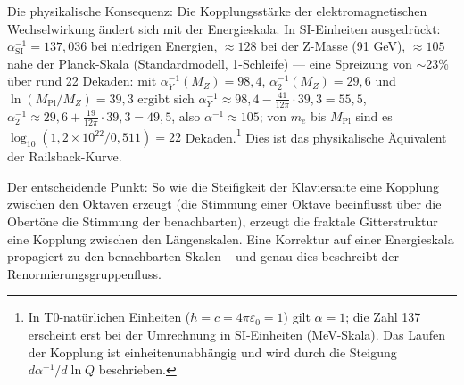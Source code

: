 Die physikalische Konsequenz: Die Kopplungsstärke der elektromagnetischen Wechselwirkung ändert sich mit der Energieskala. In SI-Einheiten ausgedrückt: $\alpha_\text{SI}^{-1} = 137{,}036$ bei niedrigen Energien, $\approx 128$ bei der Z-Masse (91 GeV), $\approx 105$ nahe der Planck-Skala (Standardmodell, 1-Schleife) --- eine Spreizung von $\sim$23\% über rund 22 Dekaden: mit $\alpha_Y^{-1}(M_Z) = 98{,}4$, $\alpha_2^{-1}(M_Z) = 29{,}6$ und $\ln(M_\text{Pl}/M_Z) = 39{,}3$ ergibt sich $\alpha_Y^{-1} \approx 98{,}4 - \frac{41}{12\pi}\cdot39{,}3 = 55{,}5$, $\alpha_2^{-1} \approx 29{,}6 + \frac{19}{12\pi}\cdot39{,}3 = 49{,}5$, also $\alpha^{-1} \approx 105$; von $m_e$ bis $M_\text{Pl}$ sind es $\log_{10}(1{,}2\times10^{22}/0{,}511) = 22$ Dekaden.\footnote{In T0-natürlichen Einheiten ($\hbar = c = 4\pi\varepsilon_0 = 1$) gilt $\alpha = 1$; die Zahl 137 erscheint erst bei der Umrechnung in SI-Einheiten (MeV-Skala). Das Laufen der Kopplung ist einheitenunabhängig und wird durch die Steigung $d\alpha^{-1}/d\ln Q$ beschrieben.} Dies ist das physikalische Äquivalent der Railsback-Kurve.

\begin{table}[h]
\centering
{}
\caption{Inharmonizität einer steifen Saite und Renormierungsgruppenfluss auf dem fraktalen Torus.}
\label{tab:inharmonizitaet}
\end{table}

Der entscheidende Punkt: So wie die Steifigkeit der Klaviersaite eine Kopplung zwischen den Oktaven erzeugt (die Stimmung einer Oktave beeinflusst über die Obertöne die Stimmung der benachbarten), erzeugt die fraktale Gitterstruktur eine Kopplung zwischen den Längenskalen. Eine Korrektur auf einer Energieskala propagiert zu den benachbarten Skalen -- und genau dies beschreibt der Renormierungsgruppenfluss.

